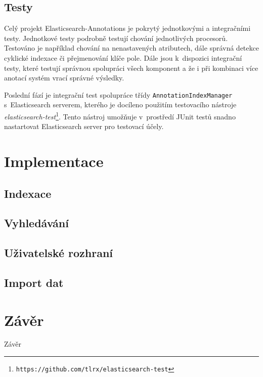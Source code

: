 \documentclass[11pt,oneside]{fithesis2}
\begin{document}
\section{Testy}
Celý projekt Elasticsearch-Annotations je pokrytý jednotkovými a integračními testy. Jednotkové testy podrobně testují chování jednotlivých procesorů. Testováno je například chování na nenastavených atributech, dále správná detekce cyklické indexace či přejmenování klíče pole. Dále jsou k~dispozici integrační testy, které testují správnou spolupráci všech komponent a že i při kombinaci více anotací systém vrací správné výsledky. 

Poslední fází je integrační test spolupráce třídy \texttt{AnnotationIndexManager} s~Elasticsearch serverem, kterého je docíleno použitím testovacího nástroje \emph{elasticsearch-test}\footnote{\texttt{https://github.com/tlrx/elasticsearch-test}}. Tento nástroj umožňuje v~prostředí JUnit testů snadno nastartovat Elasticsearch server pro testovací účely.

\chapter{Implementace}

\section{Indexace}

\section{Vyhledávání}

\section{Uživatelské rozhraní}

\section{Import dat}

\chapter{Závěr}
Závěr


\end{document}
